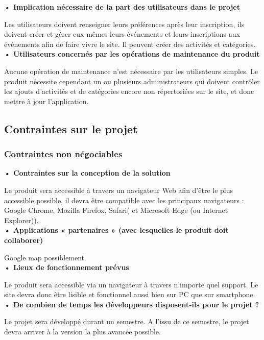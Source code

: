 \textbf{• Implication nécessaire de la part des utilisateurs dans le projet}

Les utilisateurs doivent renseigner leurs préférences après leur inscription, ils doivent créer et gérer eux-mêmes leurs événements et leurs inscriptions aux événements afin de faire vivre le site. Il peuvent créer des activités et catégories. \\

\textbf{• Utilisateurs concernés par les opérations de maintenance du produit}

Aucune opération de maintenance n’est nécessaire par les utilisateurs simples. Le produit nécessite cependant un ou plusieurs administrateurs qui doivent contrôler les ajouts d'activités et de catégories encore non répertoriées sur le site, et donc mettre à jour l’application.

\subsection{Contraintes sur le projet}

\subsubsection{Contraintes non négociables}

\textbf{• Contraintes sur la conception de la solution}

Le produit sera accessible à travers un navigateur Web afin d’être le plus accessible possible, il devra être compatible avec les principaux navigateurs : Google Chrome, Mozilla Firefox, Safari( et Microsoft Edge (ou Internet Explorer)). \\

\textbf{• Applications « partenaires » (avec lesquelles le produit doit collaborer)}

Google map possiblement. \\

\textbf{• Lieux de fonctionnement prévus}

Le produit sera accessible via un navigateur à travers n’importe quel support. Le site devra donc être lisible et fonctionnel aussi bien sur PC que sur smartphone. \\

\textbf{• De combien de temps les développeurs disposent-ils pour le projet ?}

Le projet sera développé durant un semestre. A l’issu de ce semestre, le projet devra arriver à la version la plus avancée possible.

